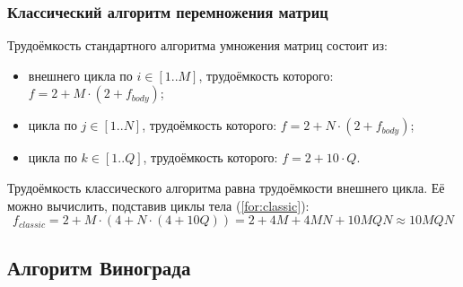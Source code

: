 \newpage
\subsubsection{Классический алгоритм перемножения матриц}

Трудоёмкость стандартного алгоритма умножения матриц состоит из:

\begin{itemize}
	\item внешнего цикла по $i \in [1..M]$, трудоёмкость которого: $f = 2 + M \cdot (2 + f_{body})$;
	\item цикла по $j \in [1..N]$, трудоёмкость которого: $f = 2 + N \cdot (2 + f_{body})$;
	\item цикла по $k \in [1..Q]$, трудоёмкость которого: $f = 2 + 10 \cdot Q$.
\end{itemize}

Трудоёмкость классического алгоритма равна трудоёмкости внешнего цикла.
Её можно вычислить, подставив циклы тела (\ref{for:classic}):
\begin{equation}
	\label{for:classic}
	f_{classic} = 2 + M \cdot (4 + N \cdot (4 + 10Q)) = 2 + 4M + 4MN + 10MQN \approx 10MQN
\end{equation}

\subsection{Алгоритм Винограда}

